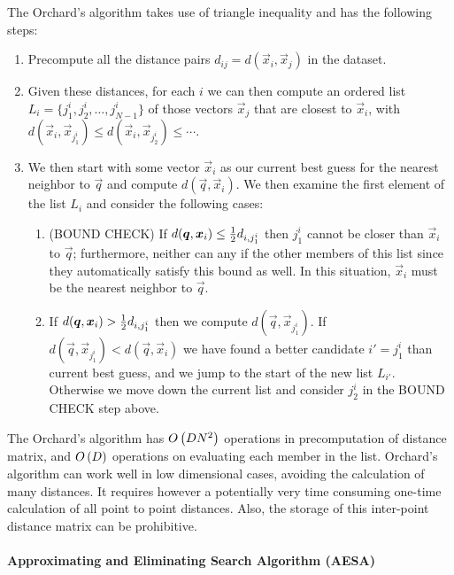 The Orchard's algorithm takes use of triangle inequality and has the following steps:
\begin{enumerate}
	\item Precompute all the distance pairs $d_{ij}=d(\vec{x}_i,\vec{x}_j)$ in the dataset.
	\item Given these distances, for each $i$ we can then compute an ordered list $L_i=\{j_1^i,j_2^i,\dotsc,j_{N-1}^i\}$ of those vectors $\vec{x}_j$ that are closest to $\vec{x}_i$, with $d(\vec{x}_i,\vec{x}_{j_1^i})\leq d(\vec{x}_i,\vec{x}_{j_2^i})\leq\cdots$.
	\item We then start with some vector $\vec{x}_i$ as our current best guess for the nearest neighbor to $\vec{q}$ and compute $d(\vec{q},\vec{x}_i)$. We then examine the first element of the list $L_i$ and consider the following cases:
	\begin{enumerate}
		\item (BOUND CHECK) If $d(\boldsymbol{q},\boldsymbol{x}_i)\leq\frac{1}{2} d_{i,j_1^i}$ then $j_1^i$ cannot be closer than $\vec{x}_i$ to $\vec{q}$; furthermore, neither can any if the other members of this list since they automatically satisfy this bound as well. In this situation, $\vec{x}_i$ must be the nearest neighbor to $\vec{q}$.
		\item If $d(\boldsymbol{q},\boldsymbol{x}_i)>\frac{1}{2} d_{i,j_1^i}$ then we compute $d(\vec{q},\vec{x}_{j_1^i})$. If $d(\vec{q},\vec{x}_{j_1^i})<d(\vec{q},\vec{x}_i)$ we have found a better candidate $i'=j_1^i$ than current best guess, and we jump to the start of the new list $L_{i'}$. Otherwise we move down the current list and consider $j_2^i$ in the BOUND CHECK step above.
	\end{enumerate}
\end{enumerate}

The Orchard's algorithm has $O\left(DN^2\right)$ operations in precomputation of distance matrix, and $O\left(D\right)$ operations on evaluating each member in the list. Orchard's algorithm can work well in low dimensional cases, avoiding the calculation of many distances. It requires however a potentially very time consuming one-time calculation of all point to point distances. Also, the storage of this inter-point distance matrix can be prohibitive.

\paragraph{Approximating and Eliminating Search Algorithm (AESA)}

